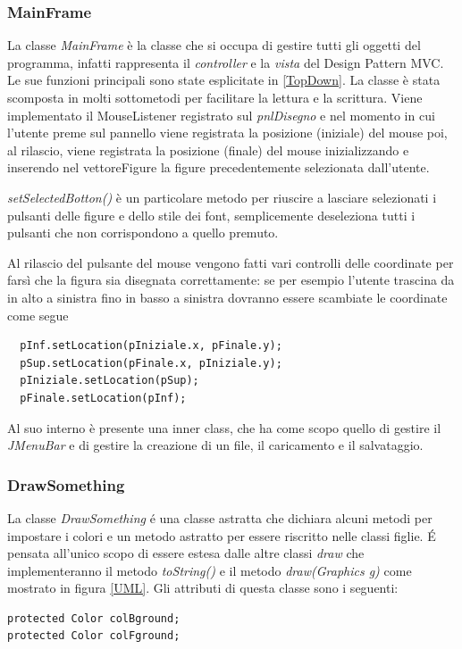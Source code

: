 \documentclass[a4paper,12pt,times,numbered,print,index]{article}
\begin{document}
\subsubsection{MainFrame} %
La classe \textit{MainFrame} è la classe che si occupa di gestire tutti gli oggetti del programma, infatti rappresenta il \textit{controller} e la \textit{vista} del Design Pattern MVC. Le sue funzioni principali sono state esplicitate in \ref{TopDown}. La classe è stata scomposta in molti sottometodi per facilitare la lettura e la scrittura. Viene implementato il MouseListener registrato sul \textit{pnlDisegno} e nel momento in cui l'utente preme sul pannello viene registrata la posizione (iniziale) del mouse poi, al rilascio, viene registrata la posizione (finale) del mouse inizializzando e inserendo nel vettoreFigure la figure precedentemente selezionata dall'utente.

\textit{setSelectedBotton()} è un particolare metodo per riuscire a lasciare selezionati i pulsanti delle figure e dello stile dei font, semplicemente deseleziona tutti i pulsanti che non corrispondono a quello premuto.

Al rilascio del pulsante del mouse vengono fatti vari controlli delle coordinate per farsì che la figura sia disegnata correttamente: se per esempio l'utente trascina da in alto a sinistra fino in basso a sinistra dovranno essere scambiate le coordinate come segue
\begin{lstlisting}
  pInf.setLocation(pIniziale.x, pFinale.y);
  pSup.setLocation(pFinale.x, pIniziale.y);
  pIniziale.setLocation(pSup);
  pFinale.setLocation(pInf);
\end{lstlisting}
Al suo interno è presente una inner class, che ha come scopo quello di gestire il \textit{JMenuBar} e di gestire la creazione di un file, il caricamento e il salvataggio.

\subsubsection{DrawSomething}
La classe \textit{DrawSomething} é una classe astratta che dichiara alcuni metodi per impostare i colori e un metodo astratto per essere riscritto nelle classi figlie.
É pensata all'unico scopo di essere estesa dalle altre classi \textit{draw} che implementeranno il metodo \textit{toString()} e il metodo \textit{draw(Graphics g)} come mostrato in figura \ref{UML}.
Gli attributi di questa classe sono i seguenti:
\begin{lstlisting}
protected Color colBground;
protected Color colFground;
\end{lstlisting}
\end{document}
